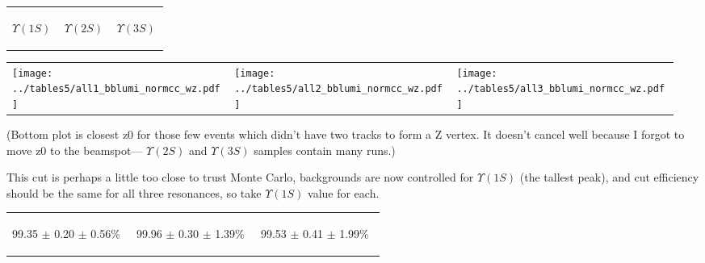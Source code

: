 \documentclass[landscape]{article}
\begin{document}
\vspace{-1.75 cm}
\begin{center}
  \begin{tabular}{p{0.32\linewidth} p{0.32\linewidth} p{0.32\linewidth}}
    \begin{center} $\Upsilon(1S)$ \end{center} & \begin{center} $\Upsilon(2S)$ \end{center} & \begin{center} $\Upsilon(3S)$ \end{center} \\
  \end{tabular}

  \vspace{-0.75 cm}
  \begin{tabular}{p{0.32\linewidth} p{0.32\linewidth} p{0.32\linewidth}}
    \texttt{[image: ../tables5/all1\_bblumi\_normcc\_wz.pdf]} &
    \texttt{[image: ../tables5/all2\_bblumi\_normcc\_wz.pdf]} &
    \texttt{[image: ../tables5/all3\_bblumi\_normcc\_wz.pdf]}
  \end{tabular}
\end{center}

(Bottom plot is closest z0 for those few events which didn't have two
tracks to form a Z vertex.  It doesn't cancel well because I forgot to
move z0 to the beamspot--- $\Upsilon(2S)$ and $\Upsilon(3S)$ samples
contain many runs.)

\vfill

This cut is perhaps a little too close to trust Monte Carlo,
backgrounds are now controlled for $\Upsilon(1S)$ (the tallest peak),
and cut efficiency should be the same for all three resonances, so
take $\Upsilon(1S)$ value for each.

\vspace{-1.5 cm}
\begin{center}
  \begin{tabular}{p{0.32\linewidth} p{0.32\linewidth} p{0.32\linewidth}}
    \begin{center} 99.35 $\pm$ 0.20 $\pm$ 0.56\% \end{center} &
    \begin{center} 99.96 $\pm$ 0.30 $\pm$ 1.39\% \end{center} &
    \begin{center} 99.53 $\pm$ 0.41 $\pm$ 1.99\% \end{center}
  \end{tabular}
\end{center}
\end{document}
